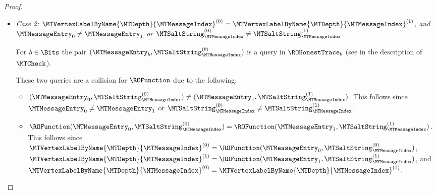 \begin{proof}
\begin{itemize}
These two queries are a collision for $\ROFunction$ due to the following.
\begin{itemize}[nosep]

  \item $(\MTLeftVertexLabel^{(0)},\MTRightVertexLabel^{(0)}) \neq (\MTLeftVertexLabel^{(1)},\MTRightVertexLabel^{(1)})$. \\ This follows since $\MTVertexLabelByPath{\MTMessageIndex}{\MTLayer}^{(0)} \neq \MTVertexLabelByPath{\MTMessageIndex}{\MTLayer}^{(1)}$ or $\MTVertexLabelByCoPath{\MTMessageIndex}{\MTLayer}^{(0)} \neq \MTVertexLabelByCoPath{\MTMessageIndex}{\MTLayer}^{(1)}$.

  \item $\ROFunction(\MTLeftVertexLabel^{(0)},\MTRightVertexLabel^{(0)})=\ROFunction(\MTLeftVertexLabel^{(1)},\MTRightVertexLabel^{(1)})$. \\ This follows since $\MTVertexLabelByPath{\MTMessageIndex}{\MTLayer-1}^{(0)} = \ROFunction(\MTLeftVertexLabel^{(0)},\MTRightVertexLabel^{(0)})$, $\MTVertexLabelByPath{\MTMessageIndex}{\MTLayer-1}^{(1)} = \ROFunction(\MTLeftVertexLabel^{(1)},\MTRightVertexLabel^{(1)})$, and $\MTVertexLabelByPath{\MTMessageIndex}{\MTLayer-1}^{(0)} = \MTVertexLabelByPath{\MTMessageIndex}{\MTLayer-1}^{(1)}$. The last equality holds because $\MTLayer$ is the minimal index satisfying the condition (and we know that $\MTVertexLabelByName{0}{1}^{(0)}=\MTVertexLabelByName{0}{1}^{(1)}$).

\end{itemize}

  \item \emph{Case 2: $\MTVertexLabelByName{\MTDepth}{\MTMessageIndex}^{(0)}=\MTVertexLabelByName{\MTDepth}{\MTMessageIndex}^{(1)}$, and $\MTMessageEntry_{0} \neq \MTMessageEntry_{1}$ or $\MTSaltString_{\MTMessageIndex}^{(0)} \neq \MTSaltString_{\MTMessageIndex}^{(1)}$.}

For $b \in \Bits$ the pair $(\MTMessageEntry_{b},\MTSaltString_{\MTMessageIndex}^{(b)})$ is a query in $\ROHonestTrace_{b}$ (see  in the description of $\MTCheck$).

These two queries are a collision for $\ROFunction$ due to the following.
\begin{itemize}[nosep]
  \item $(\MTMessageEntry_{0},\MTSaltString_{\MTMessageIndex}^{(0)}) \neq (\MTMessageEntry_{1},\MTSaltString_{\MTMessageIndex}^{(1)})$. This follows since $\MTMessageEntry_{0} \neq \MTMessageEntry_{1}$ or $\MTSaltString_{\MTMessageIndex}^{(0)} \neq \MTSaltString_{\MTMessageIndex}^{(1)}$.
  \item $\ROFunction(\MTMessageEntry_{0},\MTSaltString_{\MTMessageIndex}^{(0)})=\ROFunction(\MTMessageEntry_{1},\MTSaltString_{\MTMessageIndex}^{(1)})$. This follows since $\MTVertexLabelByName{\MTDepth}{\MTMessageIndex}^{(0)} = \ROFunction(\MTMessageEntry_{0},\MTSaltString_{\MTMessageIndex}^{(0)})$, $\MTVertexLabelByName{\MTDepth}{\MTMessageIndex}^{(1)} = \ROFunction(\MTMessageEntry_{1},\MTSaltString_{\MTMessageIndex}^{(1)})$, and $\MTVertexLabelByName{\MTDepth}{\MTMessageIndex}^{(0)}=\MTVertexLabelByName{\MTDepth}{\MTMessageIndex}^{(1)}$.
\end{itemize}


\end{itemize}
\end{proof}
